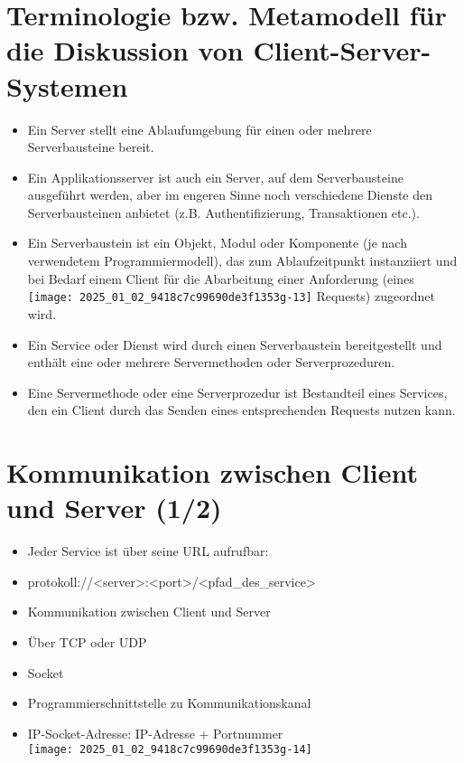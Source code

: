 \documentclass[10pt]{article}
\begin{document}
\section*{Terminologie bzw. Metamodell für die Diskussion von Client-Server-Systemen}
\begin{itemize}
  \item Ein Server stellt eine Ablaufumgebung für einen oder mehrere Serverbausteine bereit.
  \item Ein Applikationsserver ist auch ein Server, auf dem Serverbausteine ausgeführt werden, aber im engeren Sinne noch verschiedene Dienste den Serverbausteinen anbietet (z.B. Authentifizierung, Transaktionen etc.).
  \item Ein Serverbaustein ist ein Objekt, Modul oder Komponente (je nach verwendetem Programmiermodell), das zum Ablaufzeitpunkt instanziiert und bei Bedarf einem Client für die Abarbeitung einer Anforderung (eines\\
\texttt{[image: 2025\_01\_02\_9418c7c99690de3f1353g-13]} Requests) zugeordnet wird.
  \item Ein Service oder Dienst wird durch einen Serverbaustein bereitgestellt und enthält eine oder mehrere Servermethoden oder Serverprozeduren.
  \item Eine Servermethode oder eine Serverprozedur ist Bestandteil eines Services, den ein Client durch das Senden eines entsprechenden Requests nutzen kann.
\end{itemize}

\section*{Kommunikation zwischen Client und Server (1/2)}
\begin{itemize}
  \item Jeder Service ist über seine URL aufrufbar:
  \item protokoll://<server>:<port>/<pfad\_des\_service>
  \item Kommunikation zwischen Client und Server
  \item Über TCP oder UDP
  \item Socket
  \item Programmierschnittstelle zu Kommunikationskanal
  \item IP-Socket-Adresse: IP-Adresse + Portnummer\\
\texttt{[image: 2025\_01\_02\_9418c7c99690de3f1353g-14]}
\end{itemize}
\end{document}
